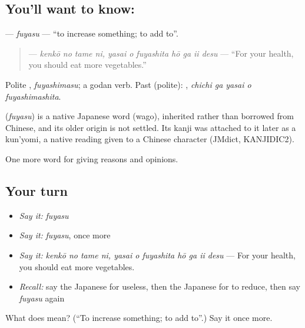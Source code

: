 \subsection*{You'll want to know: }
\textbf{} — \emph{fuyasu} — \textquotedblleft{}to increase something; to add to\textquotedblright{}.

\begin{quote}
\textbf{    } — \emph{kenkō no tame ni, yasai o fuyashita hō ga ii desu} — \textquotedblleft{}For your health, you should eat more vegetables.\textquotedblright{}
\end{quote}

Polite \textbf{}, \emph{fuyashimasu}; a godan verb. Past (polite): \textbf{  }, \emph{chichi ga yasai o fuyashimashita}.

\begin{cousinweb}
\textbf{} (\emph{fuyasu}) is a native Japanese word (wago), inherited rather than borrowed from Chinese, and its older origin is not settled. Its kanji was attached to it later as a kun'yomi, a native reading given to a Chinese character (JMdict, KANJIDIC2).
\end{cousinweb}

\begin{grammarlens}[title={What you've built}]
One more word for giving reasons and opinions.
\end{grammarlens}

\subsection*{Your turn}
\begin{itemize}
\raggedright
  \item \emph{Say it:} \emph{fuyasu}
  \item \emph{Say it:} \emph{fuyasu}, once more
  \item \emph{Say it:} \emph{kenkō no tame ni, yasai o fuyashita hō ga ii desu} — For your health, you should eat more vegetables.
  \item \emph{Recall:} say the Japanese for useless, then the Japanese for to reduce, then say \emph{fuyasu} again
\end{itemize}

\begin{tcolorbox}[breakable,colback=teal!4,colframe=teal!35!black,title={Before you move on}]
What does  mean? (\textquotedblleft{}To increase something; to add to\textquotedblright{}.) Say it once more.
\end{tcolorbox}
